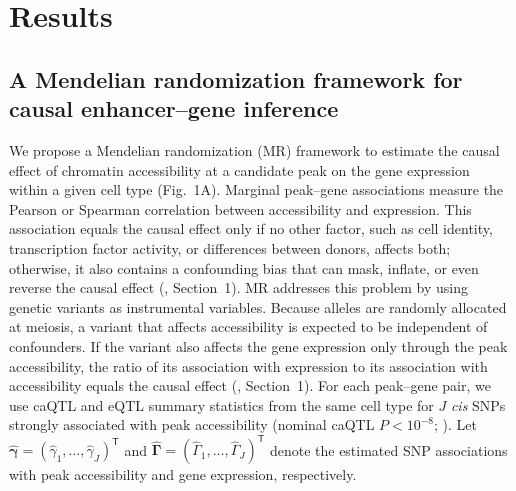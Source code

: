 \section{Results}
\label{sec:results}
\subsection{A Mendelian randomization framework for causal enhancer--gene inference}
\label{res:analysis-set}

We propose a Mendelian randomization (MR) framework to estimate the causal effect of chromatin accessibility at a candidate peak on the gene expression within a given cell type (Fig.~1A). Marginal peak--gene associations measure the Pearson or Spearman correlation between accessibility and expression. This association equals the causal effect only if no other factor, such as cell identity, transcription factor activity, or differences between donors, affects both; otherwise, it also contains a confounding bias that can mask, inflate, or even reverse the causal effect (, Section~1). MR addresses this problem by using genetic variants as instrumental variables. Because alleles are randomly allocated at meiosis, a variant that affects accessibility is expected to be independent of confounders. If the variant also affects the gene expression only through the peak accessibility, the ratio of its association with expression to its association with accessibility equals the causal effect (, Section~1). For each peak--gene pair, we use caQTL and eQTL summary statistics from the same cell type for \(J\) \textit{cis} SNPs strongly associated with peak accessibility (nominal caQTL \(P<10^{-8}\); ). Let \(\hat{\boldsymbol{\gamma}}=(\hat{\gamma}_1,\ldots,\hat{\gamma}_J)^{\mathsf T}\) and \(\hat{\boldsymbol{\Gamma}}=(\hat{\Gamma}_1,\ldots,\hat{\Gamma}_J)^{\mathsf T}\) denote the estimated SNP associations with peak accessibility and gene expression, respectively.

